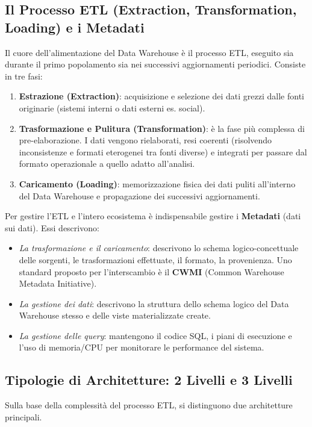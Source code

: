 \subsection{Il Processo ETL (Extraction, Transformation, Loading) e i Metadati}
Il cuore dell'alimentazione del Data Warehouse è il processo ETL, eseguito sia durante il primo popolamento sia nei successivi aggiornamenti periodici. Consiste in tre fasi:
\begin{enumerate}
\item \textbf{Estrazione (Extraction)}: acquisizione e selezione dei dati grezzi dalle fonti originarie (sistemi interni o dati esterni es. social).
\item \textbf{Trasformazione e Pulitura (Transformation)}: è la fase più complessa di pre-elaborazione. I dati vengono rielaborati, resi coerenti (risolvendo inconsistenze e formati eterogenei tra fonti diverse) e integrati per passare dal formato operazionale a quello adatto all'analisi.
\item \textbf{Caricamento (Loading)}: memorizzazione fisica dei dati puliti all'interno del Data Warehouse e propagazione dei successivi aggiornamenti.
\end{enumerate}

Per gestire l'ETL e l'intero ecosistema è indispensabile gestire i \textbf{Metadati} (dati sui dati). Essi descrivono:
\begin{itemize}
\item \textit{La trasformazione e il caricamento}: descrivono lo schema logico-concettuale delle sorgenti, le trasformazioni effettuate, il formato, la provenienza. Uno standard proposto per l'interscambio è il \textbf{CWMI} (Common Warehouse Metadata Initiative).
\item \textit{La gestione dei dati}: descrivono la struttura dello schema logico del Data Warehouse stesso e delle viste materializzate create.
\item \textit{La gestione delle query}: mantengono il codice SQL, i piani di esecuzione e l'uso di memoria/CPU per monitorare le performance del sistema.
\end{itemize}

\subsection{Tipologie di Architetture: 2 Livelli e 3 Livelli}

Sulla base della complessità del processo ETL, si distinguono due architetture principali.

